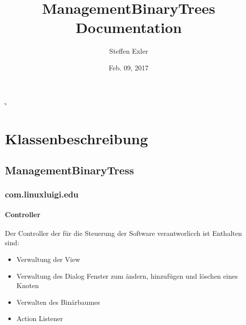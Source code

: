 \documentclass[letterpaper,10pt,ngerman]{sphinxmanual}
\title{ManagementBinaryTrees Documentation}
\date{Feb. 09, 2017}
\author{Steffen Exler}
\begin{document}
\if\catcode`\"\active{}\fi
\maketitle
\sphinxtableofcontents
{}\label{\detokenize{index::doc}}



\chapter{Klassenbeschreibung}
\label{\detokenize{index:welcome-to-managementbinarytrees-s-documentation}}\label{\detokenize{index:klassenbeschreibung}}

\section{ManagementBinaryTress}
\label{\detokenize{packages:managementbinarytress}}\label{\detokenize{packages::doc}}

\subsection{com.linuxluigi.edu}
\label{\detokenize{com/linuxluigi/edu/package-index:package-com.linuxluigi.edu}}\label{\detokenize{com/linuxluigi/edu/package-index::doc}}\label{\detokenize{com/linuxluigi/edu/package-index:com-linuxluigi-edu}}

\subsubsection{Controller}
\label{\detokenize{com/linuxluigi/edu/Controller::doc}}\label{\detokenize{com/linuxluigi/edu/Controller:controller}}

\begin{fulllineitems}
\label{\detokenize{com/linuxluigi/edu/Controller:com.linuxluigi.edu.Controller}}
Der Controller der für die Steuerung der Software verantworlicch ist Enthalten sind:
\begin{itemize}
\item {} 
Verwaltung der View

\item {} 
Verwaltung des Dialog Fenster zum ändern, hinzufügen und löschen eines Knoten

\item {} 
Verwalten des Binärbaumes

\item {} 
Action Listener

\end{itemize}

\end{fulllineitems}
\end{document}
